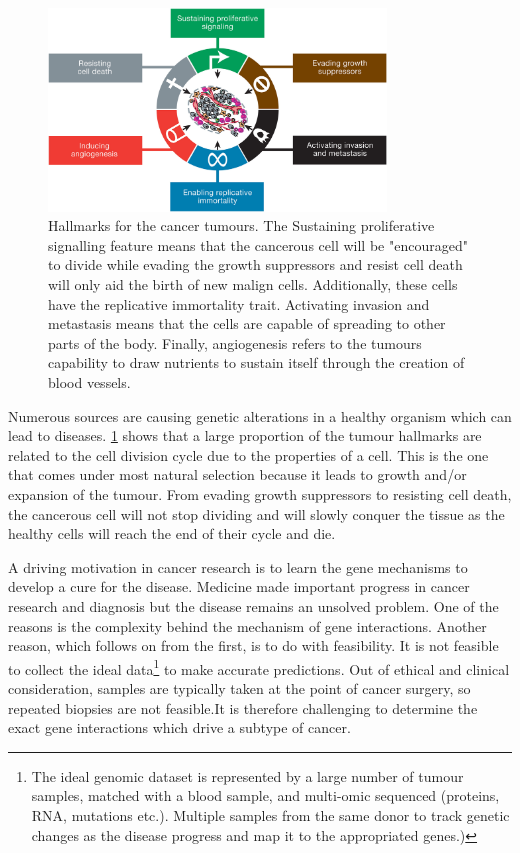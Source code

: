 \begin{figure}[!t]
  \centering\includegraphics[width=0.8\textwidth,height=0.8\textheight,keepaspectratio]{Sections/Lit_review/Resources/tumour_causes.jpeg}
    \caption{Hallmarks for the cancer tumours\cite{Hanahan2011-px}. The Sustaining proliferative signalling feature means that the cancerous cell will be "encouraged" to divide while evading the growth suppressors and resist cell death will only aid the birth of new malign cells. Additionally, these cells have the replicative immortality trait. Activating invasion and metastasis means that the cells are capable of spreading to other parts of the body. Finally, angiogenesis refers to the tumours capability to draw nutrients to sustain itself through the creation of blood vessels. }
    \label{fig:hallmarks_cancer}
\end{figure}

Numerous sources are causing genetic alterations in a healthy organism which can lead to diseases. \cref{fig:hallmarks_cancer} shows that a large proportion of the tumour hallmarks are related to the cell division cycle due to the properties of a cell. This is the one that comes under most natural selection because it leads to growth and/or expansion of the tumour. From evading growth suppressors to resisting cell death, the cancerous cell will not stop dividing and will slowly conquer the tissue as the healthy cells will reach the end of their cycle and die.

A driving motivation in cancer research is to learn the gene mechanisms to develop a cure for the disease. Medicine made important progress in cancer research and diagnosis but the disease remains an unsolved problem. One of the reasons is the complexity behind the mechanism of gene interactions. Another reason, which follows on from the first, is to do with feasibility. It is not feasible to collect the ideal data\footnote{The ideal genomic dataset is represented by a large number of tumour samples, matched with a blood sample, and multi-omic sequenced (proteins, RNA, mutations etc.). Multiple samples from the same donor to track genetic changes as the disease progress and map it to the appropriated genes.)} to make accurate predictions. Out of ethical and clinical consideration, samples are typically taken at the point of cancer surgery, so repeated biopsies are not feasible.It is therefore challenging to determine the exact gene interactions which drive a subtype of cancer. 

